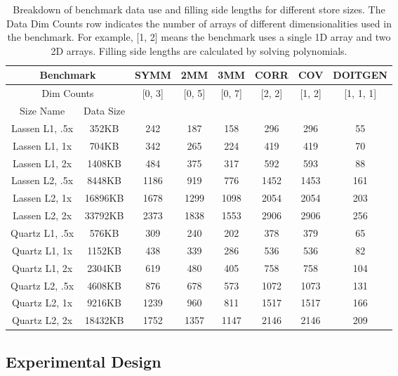 \begin{table}
	\centering
	\begin{tabular}{|c|c||c|c|c|c|c|c|}
		\hline
		\multicolumn{2}{|c|}{Benchmark} & SYMM & 2MM & 3MM & CORR & COV & DOITGEN \\ \hline
		\multicolumn{2}{|c|}{Dim Counts} & [0, 3] & [0, 5] & [0, 7] & [2, 2] & [1, 2] & [1, 1, 1] \\ \hline
	\hline
	Size Name & Data Size &   &   &   &   &   &   \\ \hline
	Lassen L1, .5x & 352KB & 242 & 187 & 158 & 296 & 296 & 55 \\ \hline
	Lassen L1, 1x & 704KB & 342 & 265 & 224 & 419 & 419 & 70 \\ \hline
	Lassen L1, 2x & 1408KB & 484 & 375 & 317 & 592 & 593 & 88 \\ \hline
	Lassen L2, .5x & 8448KB & 1186 & 919 & 776 & 1452 & 1453 & 161 \\ \hline
	Lassen L2, 1x & 16896KB & 1678 & 1299 & 1098 & 2054 & 2054 & 203 \\ \hline
	Lassen L2, 2x & 33792KB & 2373 & 1838 & 1553 & 2906 & 2906 & 256 \\ \hline
	Quartz L1, .5x & 576KB & 309 & 240 & 202 & 378 & 379 & 65 \\ \hline
	Quartz L1, 1x & 1152KB & 438 & 339 & 286 & 536 & 536 & 82 \\ \hline
	Quartz L1, 2x & 2304KB & 619 & 480 & 405 & 758 & 758 & 104 \\ \hline
	Quartz L2, .5x & 4608KB & 876 & 678 & 573 & 1072 & 1073 & 131 \\ \hline
	Quartz L2, 1x & 9216KB & 1239 & 960 & 811 & 1517 & 1517 & 166 \\ \hline
	Quartz L2, 2x & 18432KB & 1752 & 1357 & 1147 & 2146 & 2146 & 209 \\ \hline	
\end{tabular}	
\caption{Breakdown of benchmark data use and filling side lengths for different store sizes. The Data Dim Counts row indicates the number of arrays of different dimensionalities used in the benchmark. For example, [1, 2] means the benchmark uses a single 1D array and two 2D arrays. Filling side lengths are calculated by solving polynomials.}\label{fillingSizes}
\end{table}

\subsection{Experimental Design}

